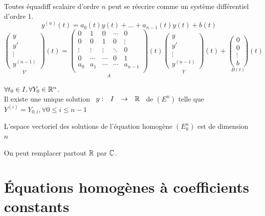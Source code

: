 \documentclass[]{report}
\begin{document}
\begin{ra}{}{}
    Toutes équadiff scalaire d'ordre $n$ peut se réecrire comme un système différentiel d'ordre 1.
    \[y^{(n)}(t)=a_0(t)y(t)+\ldots+a_{n-1}(t)y(t)+b(t)\]
    \[\underset{Y'}{\begin{pmatrix}
        y\\
        y'\\
        \vdots\\
        y^{(n-1)}
    \end{pmatrix}}(t)=\underset{A}{\begin{pmatrix}
        0&1&0&\cdots&0\\
        0&0&1&0&\vdots \\
        \vdots&\vdots&\vdots&\ddots&0 \\
        0&\cdots&\cdots&0&1 \\
        a_0&a_1&\cdots&\cdots&a_{n-1} \\
    \end{pmatrix}}(t)\underset{Y}{\begin{pmatrix}
        y\\
        y'\\
        \vdots\\
        y^{(n-1)}
    \end{pmatrix}}(t)+\underset{B(t)}{\begin{pmatrix}
        0\\
        0\\
        \vdots\\
        b
    \end{pmatrix}}(t)\]
\end{ra}

\begin{cor}{}{}
    $\forall t_0\in I,\forall Y_0\in \mathbb{R}^n$.\\
    Il existe une unique solution $\begin{array}{ccccc} y : & I & \to & \mathbb{R} \end{array}$ de $(E^n)$ telle que $Y^{(i)}=Y_{0,i},\forall 0\le i\le n-1$
\end{cor}

\begin{cor}{}{}
    L'espace vectoriel des solutions de l'équation homogène $(E_0^n)$ est de dimension $n$
\end{cor}

\begin{re}{}{}
    On peut remplacer partout $\mathbb{R}$ par $\mathbb{C}$.
\end{re}

\section{Équations homogènes à coefficients constants}
\end{document}
